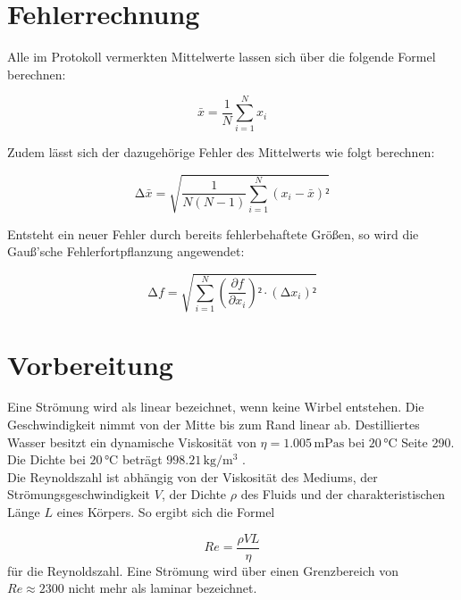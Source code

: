 \noindent

  \section{Fehlerrechnung}
  \label{sec:Fehlerrechnung}
  
  Alle im Protokoll vermerkten Mittelwerte lassen sich über die folgende Formel berechnen:
  
  \begin{equation}
  \label{eqn:Mittelwert}
      \bar{x} = \frac{1}{N}\sum_{i=1}^N x_i
  \end{equation}
  
  \noindent
  Zudem lässt sich der dazugehörige Fehler des Mittelwerts wie folgt berechnen:
  
  \begin{equation}
  \label{eqn:Mittelwertfehler}
      \increment \bar{x} = \sqrt{\frac{1}{N\left(N-1\right)}\sum_{i=1}^N \left(x_i - \bar{x}\right)²}
  \end{equation}
  
  \noindent
  Entsteht ein neuer Fehler durch bereits fehlerbehaftete Größen, so wird die Gauß'sche Fehlerfortpflanzung angewendet:
  
  \begin{equation}
  \label{eqn:Fehlerfortpflanzung}
      \increment f = \sqrt{\sum_{i=1}^N \left(\frac{\partial f}{\partial x_i}\right)²\cdot\left(\increment x_i\right)²}
  \end{equation}
  
  \section{Vorbereitung}
  Eine Strömung wird als linear bezeichnet, wenn keine Wirbel entstehen. Die Geschwindigkeit nimmt von der Mitte bis zum Rand linear ab.
  Destilliertes Wasser besitzt ein dynamische Viskosität von $\eta = 1.005\, \unit{\milli \pascal \second}$ bei $20\, \unit{\celsius}$ 
  \cite{Physikalisches_Praktikum} Seite 290. Die Dichte bei $20\, \unit{\celsius}$ beträgt $998.21\, \unit{\kilo \gram \per \cubic \meter}$
  \cite{Physikalisches_Praktikum}.\\
  \noindent
  Die Reynoldszahl ist abhängig von der Viskosität des Mediums, der Strömungsgeschwindigkeit $V$, der Dichte $\rho$ des Fluids und der 
  charakteristischen Länge $L$ eines Körpers. So ergibt sich die Formel 
  
  \begin{equation}
      Re = \frac{\rho V L}{\eta}
      \label{eqn:Reynolds}
  \end{equation}
  für die Reynoldszahl. Eine Strömung wird über einen Grenzbereich von $Re \approx 2300$ nicht mehr als laminar bezeichnet.

%

